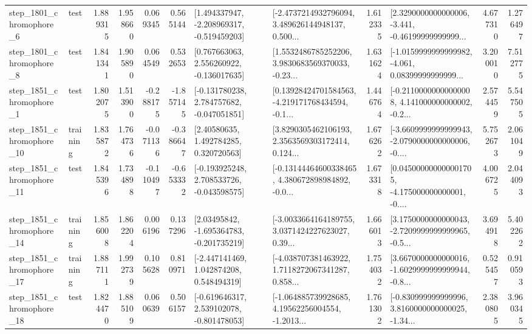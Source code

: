 \begin{tabular}{llrrrrllrlrr}
  step\_1801\_chromophore\_6 &      test &      1.889315 &    1.958660 &      0.069345 &  0.565144 &   [1.494337947, -2.208969317, -0.519459203] &  [-2.4737214932796094, 3.489626144948137, 0.500... &       1.612335 &  [2.3290000000000006, -3.441, -0.46199999999999... &            4.677310 &          1.276497 \\
  step\_1801\_chromophore\_8 &      test &      1.841341 &    1.905890 &      0.064549 &  0.532653 &    [0.767663063, 2.556260922, -0.136017635] &  [1.5532486785252206, 3.9830683569370033, -0.23... &       1.631624 &  [-1.0159999999999982, -4.061, 0.08399999999999... &            3.200010 &          7.512775 \\
  step\_1851\_chromophore\_1 &      test &      1.802075 &    1.513900 &     -0.288175 & -1.857145 &   [-0.131780238, 2.784757682, -0.047051851] &  [0.13928424701584563, -4.219171768434594, -0.1... &       1.446764 &  [-0.21100000000000008, 4.141000000000002, -0.2... &            2.574459 &          5.547505 \\
 step\_1851\_chromophore\_10 &  training &      1.835872 &    1.764736 &     -0.071136 & -0.386647 &      [2.40580635, 1.492784285, 0.320720563] &  [3.8290305462106193, 2.3563569303172414, 0.124... &       1.676262 &  [-3.6609999999999943, -2.0790000000000006, -0.... &            5.752673 &          2.061049 \\
 step\_1851\_chromophore\_11 &      test &      1.845396 &    1.734898 &     -0.110497 & -0.653332 &   [-0.193925248, 2.708533726, -0.043598575] &  [-0.13144464600338465, 4.380672898984892, -0.0... &       1.673318 &  [0.045000000000001705, -4.175000000000001, -0.... &            4.006725 &          2.044093 \\
 step\_1851\_chromophore\_14 &  training &      1.856008 &    1.862204 &      0.006196 &  0.137296 &    [2.03495842, -1.695364783, -0.201735219] &  [-3.0033664164189755, 3.0371424227623027, 0.39... &       1.666013 &  [3.1750000000000043, -2.7209999999999965, -0.5... &            3.694918 &          5.402262 \\
 step\_1851\_chromophore\_17 &  training &      1.887111 &    1.992739 &      0.105628 &  0.810971 &    [-2.447141469, 1.042874208, 0.548494319] &  [-4.038707381463922, 1.7118272067341287, 0.858... &       1.754032 &  [3.6670000000000016, -1.6029999999999944, -0.8... &            0.525457 &          0.910593 \\
 step\_1851\_chromophore\_18 &      test &      1.824470 &    1.885109 &      0.060639 &  0.506157 &   [-0.619646317, 2.539102078, -0.801478053] &  [-1.064885739928685, 4.19562256004554, -1.2013... &       1.761302 &  [-0.830999999999996, 3.8160000000000025, -1.34... &            2.380805 &          3.960345 \\

\end{tabular}
